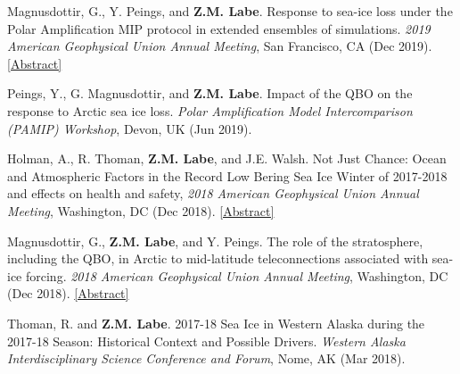 \documentclass[margin,line,palatino,courier,10pt]{res}
\begin{document}
\begin{resume}
\begin{etaremune}[leftmargin=0in,topsep=0in,parsep=0in]
\item Magnusdottir, G., Y. Peings, and \textbf{Z.M. Labe}. Response to sea-ice loss under the Polar Amplification MIP protocol in extended ensembles of simulations. \textit{2019 American Geophysical Union Annual Meeting}, San Francisco, CA (Dec 2019). \href{https://agu.confex.com/agu/fm19/meetingapp.cgi/Paper/553470}{[Abstract]}
\item Peings, Y., G. Magnusdottir, and \textbf{Z.M. Labe}. Impact of the QBO on the response to Arctic sea ice loss. \textit{Polar Amplification Model Intercomparison (PAMIP) Workshop}, Devon, UK (Jun 2019).
\item Holman, A., R. Thoman, \textbf{Z.M. Labe}, and J.E. Walsh. Not Just Chance: Ocean and Atmospheric Factors in the Record Low Bering Sea Ice Winter of 2017-2018 and effects on health and safety, \textit{2018 American Geophysical Union Annual Meeting}, Washington, DC (Dec 2018). \href{https://agu.confex.com/agu/fm18/meetingapp.cgi/Paper/451295}{[Abstract]}
\item Magnusdottir, G., \textbf{Z.M. Labe}, and Y. Peings. The role of the stratosphere, including the QBO, in Arctic to mid-latitude teleconnections associated with sea-ice forcing. \textit{2018 American Geophysical Union Annual Meeting}, Washington, DC (Dec 2018). \href{https://agu.confex.com/agu/fm18/meetingapp.cgi/Paper/399117}{[Abstract]}
\item Thoman, R. and \textbf{Z.M. Labe}. 2017-18 Sea Ice in Western Alaska during the 2017-18 Season: Historical Context and Possible Drivers. \textit{Western Alaska Interdisciplinary Science Conference and Forum}, Nome, AK (Mar 2018). 

\end{etaremune}

\vspace{-0.1in}
\noindent\textcolor{Cerulean}{\makebox[\linewidth][r]{\rule{\textwidth}{5pt}}}
\vspace{-0.3in}


\end{resume}
\end{document}
